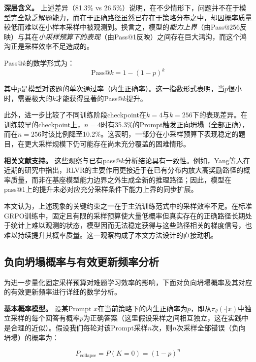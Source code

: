 \textbf{深层含义。} 上述差异（81.3\% vs 26.5\%）说明，在不少情形下，问题并不在于模型完全缺乏解题能力，而在于正确路径虽然已存在于策略分布之中，却因概率质量较低而难以在小样本采样中被观测到。换言之，模型的\textit{能力上界}（由Pass@256反映）与其在\textit{小采样预算下的表现}（由Pass@1反映）之间存在巨大鸿沟，而这个鸿沟正是采样效率不足造成的。

Pass@$k$的数学形式为：
\begin{equation}
\text{Pass}@k = 1 - \left(1 - p\right)^k
\label{eq:pass_at_k}
\end{equation}

其中$p$是模型对该题的单次通过率（内生正确率）。这一指数形式表明，当$p$很小时，需要极大的$k$才能获得显著的Pass@$k$提升。

此外，进一步比较了不同训练阶段checkpoint在$k=4$与$k=256$下的表现差异。在训练较早的checkpoint上，$n=4$时有35.3\%的Prompt触发正向坍塌（全部正确），而在$n=256$时该比例降至10.2\%。这表明，一部分在小采样预算下表现稳定的题目，在更大采样规模下仍可能存在尚未充分覆盖的困难情形。

\textbf{相关文献支持。} 这些观察与已有pass@$k$分析结论具有一致性。例如，Yang等人在近期的研究中指出，RLVR的主要作用更接近于在已有分布内放大高奖励路径的概率质量，而非在基座模型能力边界之外生成全新的推理路径；因此，模型在pass@1上的提升未必对应充分采样条件下能力上界的同步扩展。

本文认为，上述现象的关键约束之一在于主流训练范式中的采样效率不足。在标准GRPO训练中，固定且有限的采样预算使大量低概率但真实存在的正确路径长期处于统计上难以观测的状态，模型因而无法稳定获得与这些路径相关的梯度信号，也难以持续提升其概率质量。这一观察构成了本文方法设计的直接动机。

\subsection{负向坍塌概率与有效更新频率分析}
\label{subsec:collapse_probability_analysis}

为进一步量化固定采样预算对难题学习效率的影响，下面对负向坍塌概率及其对应的有效更新频率进行详细的数学分析。

\textbf{基本概率模型。} 设某Prompt $x$在当前策略下的内生正确率为$p$，即从$\pi_\theta(\cdot|x)$中独立采样的每个回答有概率$p$为正确答案（这里假设采样之间相互独立，这在实践中是合理的近似）。假设我们每轮对该Prompt采样$n$次，则$n$次采样全部错误（负向坍塌）的概率为：

\begin{equation}
P_\text{collapse} = P(K = 0) = (1 - p)^n
\label{eq:collapse_probability}
\end{equation}

